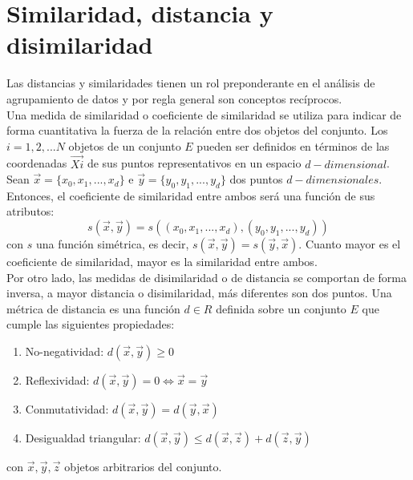 \section{Similaridad, distancia y disimilaridad}
Las distancias y similaridades tienen un rol preponderante en el análisis de agrupamiento de datos y por regla general son conceptos recíprocos.\\
Una medida de similaridad o coeficiente de similaridad se utiliza para indicar de forma cuantitativa la fuerza de la relación entre dos objetos del conjunto. Los $i = 1, 2, ...N$ objetos de un conjunto $E$ pueden ser definidos en términos de las coordenadas $\vec{Xi}$ de sus puntos representativos en un espacio $d-dimensional$. Sean $\vec{x}=\{x_0, x_1,...,x_d\}$ e $\vec{y}=\{y_0, y_1,...,y_d\}$ dos puntos $d-dimensionales$. Entonces, el coeficiente de similaridad entre ambos será una función de sus atributos:
\begin{equation}
	s(\vec{x}, \vec{y}) = s((x_0, x_1,...,x_d), (y_0, y_1,...,y_d))
\end{equation}
con $s$ una función simétrica, es decir, $s(\vec{x}, \vec{y}) = s(\vec{y}, \vec{x})$. Cuanto mayor es el coeficiente de similaridad, mayor es la similaridad entre ambos.\\
Por otro lado, las medidas de disimilaridad o de distancia se comportan de forma inversa, a mayor distancia o disimilaridad, más diferentes son dos puntos.
Una métrica de distancia es una función $d \in R$ definida sobre un conjunto $E$ que cumple las siguientes propiedades:
\begin{enumerate}
\item No-negatividad: $d(\vec{x}, \vec{y}) \geq 0$
\item Reflexividad: $d(\vec{x}, \vec{y}) = 0 \iff \vec{x} = \vec{y}$
\item Conmutatividad: $d(\vec{x}, \vec{y}) = d(\vec{y}, \vec{x})$
\item Desigualdad triangular: $d(\vec{x}, \vec{y}) \leq d(\vec{x}, \vec{z}) + d(\vec{z}, \vec{y})$
\end{enumerate}
con $\vec{x},\vec{y},\vec{z}$ objetos arbitrarios del conjunto.\\

